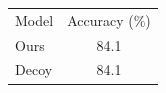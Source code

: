 \documentclass{article}
\begin{document}
\begin{tabular}{lc}
Model & Accuracy (\%) \\
Ours & 84.1 \\
Decoy & 84.1 \\
\end{tabular}
\end{document}
